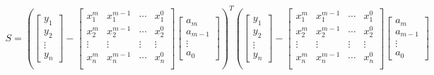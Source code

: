 \documentclass[titlepage]{jsreport}
\begin{document}
{{{\footnotesize
\begin{eqnarray}
S = \left(
        \left[
            \begin{array}{c}
            y_1\\
            y_2\\
            \vdots\\
            y_n
            \end{array}
        \right]
        -
        \left[
            \begin{array}{cccc}
            x_1^m & x_1^{m-1} & \cdots & x_1^0 \\
            x_2^m & x_2^{m-1} & \cdots & x_2^0 \\
            \vdots & \vdots & \vdots & \vdots\\
            x_n^m & x_n^{m-1} & \cdots & x_n^0 \\
            \end{array}
        \right]
        \left[
            \begin{array}{c}
            a_m\\
            a_{m-1}\\
            \vdots\\
            a_0
            \end{array}
        \right]
    \right)^T
    \left(
        \left[
            \begin{array}{c}
            y_1\\
            y_2\\
            \vdots\\
            y_n
            \end{array}
        \right]
        -
        \left[
            \begin{array}{cccc}
            x_1^m & x_1^{m-1} & \cdots & x_1^0 \\
            x_2^m & x_2^{m-1} & \cdots & x_2^0 \\
            \vdots & \vdots & \vdots & \vdots\\
            x_n^m & x_n^{m-1} & \cdots & x_n^0 \\
            \end{array}
        \right]
        \left[
            \begin{array}{c}
            a_m\\
            a_{m-1}\\
            \vdots\\
            a_0
            \end{array}
        \right]

\end{eqnarray}}}}
\end{document}
